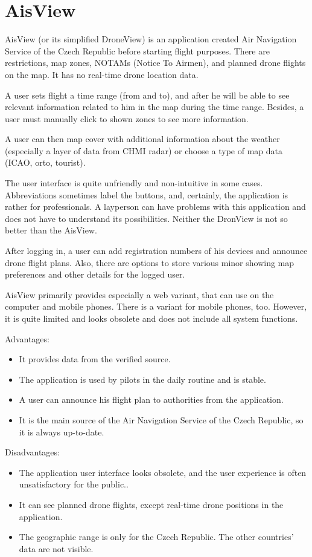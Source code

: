 \section{AisView}\label{sec:aisview}
AisView (or its simplified DroneView) is an application created Air Navigation Service of the Czech Republic before starting flight purposes.
There are restrictions, map zones, NOTAMs (Notice To Airmen), and planned drone flights on the map.
It has no real-time drone location data.

A user sets flight a time range (from and to), and after he will be able to see relevant information related to him in the map during the time range.
Besides, a user must manually click to shown zones to see more information.

A user can then map cover with additional information about the weather (especially a layer of data from CHMI radar) or choose a type of map data (ICAO, orto, tourist).

The user interface is quite unfriendly and non-intuitive in some cases.
Abbreviations sometimes label the buttons, and, certainly, the application is rather for professionals.
A layperson can have problems with this application and does not have to understand its possibilities.
Neither the DronView is not so better than the AisView.

After logging in, a user can add registration numbers of his devices and announce drone flight plans.
Also, there are options to store various minor showing map preferences and other details for the logged user.

AisView primarily provides especially a web variant, that can use on the computer and mobile phones.
There is a variant for mobile phones, too.
However, it is quite limited and looks obsolete and does not include all system functions.

Advantages:
\begin{itemize}
    \item It provides data from the verified source.
    \item The application is used by pilots in the daily routine and is stable.
    \item A user can announce his flight plan to authorities from the application.
    \item It is the main source of the Air Navigation Service of the Czech Republic, so it is always up-to-date.
\end{itemize}
Disadvantages:
\begin{itemize}
    \item The application user interface looks obsolete, and the user experience is often unsatisfactory for the public..
    \item It can see planned drone flights, except real-time drone positions in the application.
    \item The geographic range is only for the Czech Republic.
    The other countries' data are not visible.
\end{itemize}
